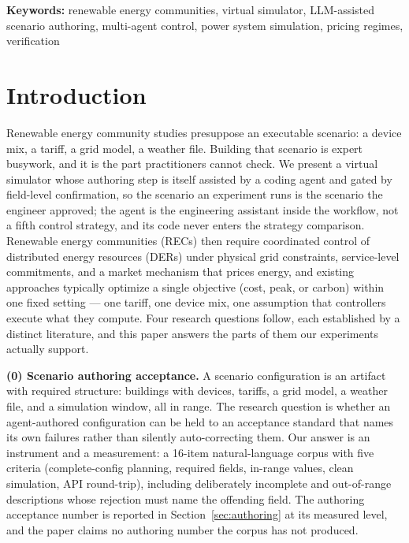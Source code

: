 \documentclass[11pt,a4paper]{article}
\newcommand{\keywords}[1]{\par\medskip\noindent\textbf{Keywords:} #1}
\begin{document}
\keywords{renewable energy communities, virtual simulator, LLM-assisted scenario authoring, multi-agent control, power system simulation, pricing regimes, verification}

\section{Introduction}
\label{sec:intro}

Renewable energy community studies presuppose an executable scenario: a device
mix, a tariff, a grid model, a weather file. Building that scenario is expert
busywork, and it is the part practitioners cannot check. We present a virtual
simulator whose authoring step is itself assisted by a coding agent and gated
by field-level confirmation, so the scenario an experiment runs is the scenario
the engineer approved; the agent is the engineering assistant inside the
workflow, not a fifth control strategy, and its code never enters the strategy
comparison. Renewable energy communities (RECs) then require coordinated
control of distributed energy resources (DERs) under physical grid
constraints, service-level commitments, and a market mechanism that prices
energy, and existing approaches typically optimize a single objective (cost,
peak, or carbon) within one fixed setting --- one tariff, one device mix, one
assumption that controllers execute what they compute. Four research questions
follow, each established by a distinct literature, and this paper answers the
parts of them our experiments actually support.

\textbf{(0) Scenario authoring acceptance.} A scenario configuration is an
artifact with required structure: buildings with devices, tariffs, a grid
model, a weather file, and a simulation window, all in range. The research
question is whether an agent-authored configuration can be held to an
acceptance standard that names its own failures rather than silently
auto-correcting them. Our answer is an instrument and a measurement: a
16-item natural-language corpus with five criteria (complete-config
planning, required fields, in-range values, clean simulation, API
round-trip), including deliberately incomplete and out-of-range
descriptions whose rejection must name the offending field. The authoring
acceptance number is reported in Section~\ref{sec:authoring} at its
measured level, and the paper claims no authoring number the corpus has
not produced.
\end{document}
